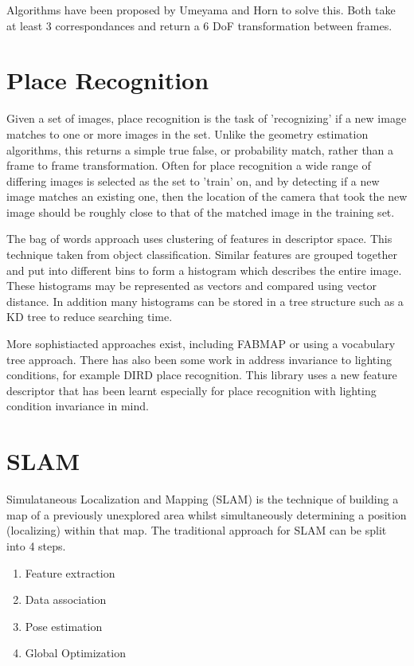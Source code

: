 Algorithms have been proposed by Umeyama\cite{umeyama} and Horn\cite{horn_87} to solve this.  Both take at least 3 correspondances and return a 6 DoF transformation between frames.

\section{Place Recognition}
\label{sec:bag_of_words}

Given a set of images, place recognition is the task of 'recognizing' if a new image matches to one or more images in the set.  Unlike the geometry estimation algorithms, this returns a simple true false, or probability match, rather than a frame to frame transformation.  Often for place recognition a wide range of differing images is selected as the set to 'train' on, and by detecting if a new image matches an existing one, then the location of the camera that took the new image should be roughly close to that of the matched image in the training set.

The bag of words approach\cite{bag_of_words} uses clustering of features in descriptor space.  This technique taken from object classification.  Similar features are grouped together and put into different bins to form a histogram which describes the entire image.  These histograms may be represented as vectors and compared using vector distance.  In addition many histograms can be stored in a tree structure such as a KD tree\cite{kdtree} to reduce searching time.

More sophistiacted approaches exist, including FABMAP\cite{fabmap} or using a vocabulary tree\cite{vocab_tree} approach.  There has also been some work in address invariance to lighting conditions, for example DIRD place recognition.  This library uses a new feature descriptor that has been learnt especially for place recognition with lighting condition invariance in mind.

\section{SLAM}
\label{sec:slam}

Simulataneous Localization and Mapping (SLAM)\cite{slam} is the technique of building a map of a previously
unexplored area whilst simultaneously determining a position (localizing) within that map.  The
traditional approach for SLAM can be split into 4 steps.
\begin{enumerate} \itemsep1pt \parskip0pt 
 \item Feature extraction
 \item Data association
 \item Pose estimation
 \item Global Optimization
\end{enumerate}

